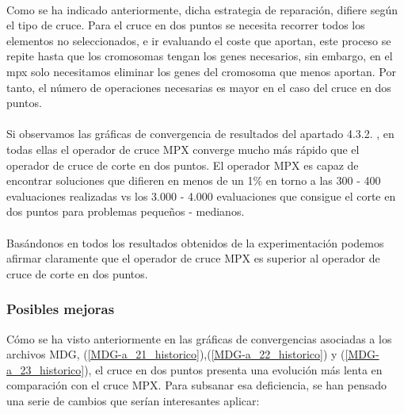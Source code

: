 	\paragraph{}Como se ha indicado anteriormente, dicha estrategia de reparación, difiere según el tipo de cruce. Para el cruce en dos puntos se necesita recorrer todos los elementos no seleccionados, e ir evaluando el coste que aportan, este proceso se repite hasta que los cromosomas tengan los genes necesarios, sin embargo, en el mpx solo necesitamos eliminar los genes del cromosoma que menos aportan. Por tanto, el número de operaciones necesarias es mayor en el caso del cruce en dos puntos.
	
	\paragraph{}Si observamos las gráficas de convergencia de resultados del apartado 4.3.2. , en todas ellas el operador de cruce MPX converge mucho más rápido que el operador de cruce de corte en dos puntos. El operador MPX es capaz de encontrar soluciones que difieren en menos de un 1\% en torno a las 300 - 400 evaluaciones realizadas vs los 3.000 - 4.000 evaluaciones que consigue el corte en dos puntos para problemas pequeños - medianos.
	
	\paragraph{}Basándonos en todos los resultados obtenidos de la experimentación podemos afirmar claramente que el operador de cruce MPX es superior al operador de cruce de corte en dos puntos.
	
	
	
	\subsubsection{Posibles mejoras}
	
	Cómo se ha visto anteriormente en las gráficas de convergencias asociadas a los archivos MDG, (\ref{MDG-a_21_historico}),(\ref{MDG-a_22_historico}) y (\ref{MDG-a_23_historico}), el cruce en dos puntos presenta una evolución más lenta en comparación con el cruce MPX. Para subsanar esa deficiencia, se han pensado una serie de cambios que serían interesantes aplicar:
	
